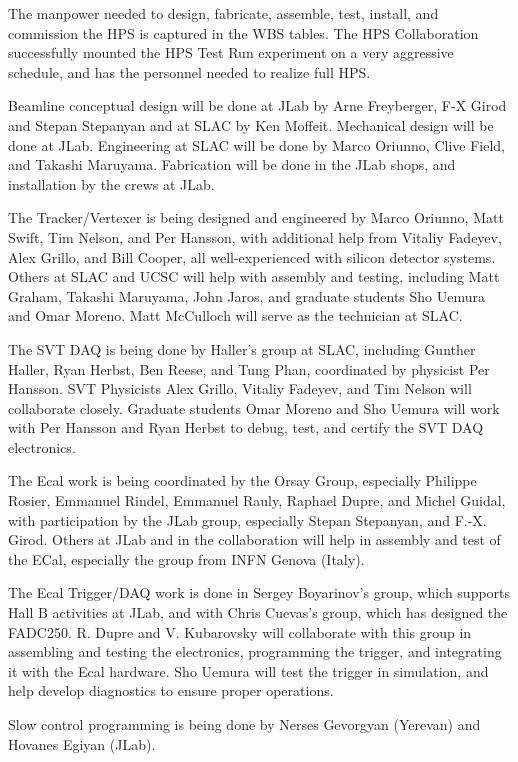 The manpower needed to design, fabricate, assemble, test, install, and commission the HPS is captured in the WBS tables. 
The HPS Collaboration successfully mounted the HPS Test Run experiment on a very aggressive schedule, and has the personnel needed to realize full HPS.

Beamline conceptual design will be done at JLab by Arne Freyberger, F-X Girod and Stepan Stepanyan and at SLAC by Ken Moffeit. 
Mechanical design will be done at JLab.
Engineering at SLAC will be done by Marco Oriunno, Clive Field, and Takashi Maruyama. Fabrication will be done in the 
JLab shops, and installation by the crews at JLab. 

The Tracker/Vertexer is being designed and engineered by Marco Oriunno, Matt Swift, Tim Nelson, and Per Hansson, with additional help 
from Vitaliy Fadeyev, Alex Grillo, and Bill Cooper, all well-experienced with silicon detector systems. Others at SLAC and UCSC will 
help with assembly and testing, including Matt Graham, Takashi Maruyama, John Jaros, and 
graduate students Sho Uemura and Omar Moreno. Matt McCulloch will serve as the technician at SLAC.

The SVT DAQ is being done by Haller's group at SLAC, including Gunther Haller, Ryan 
Herbst, Ben Reese, and Tung Phan, coordinated by physicist Per Hansson. SVT Physicists Alex Grillo, Vitaliy Fadeyev, and Tim Nelson will collaborate closely. 
Graduate students Omar Moreno and Sho Uemura will work with Per Hansson and Ryan Herbst to debug, test, and certify the SVT DAQ electronics.

The Ecal work is being coordinated by the Orsay Group, especially Philippe Rosier, Emmanuel Rindel, Emmanuel Rauly, Raphael Dupre, and Michel Guidal, 
with participation by the JLab group, especially Stepan Stepanyan, and F.-X. Girod.  Others at JLab and in the collaboration will help in 
assembly and test of the ECal, especially the group from INFN Genova (Italy).

The Ecal Trigger/DAQ work is done in Sergey Boyarinov's group, which supports Hall B activities at JLab, and with Chris Cuevas's group, which has designed the FADC250.
R. Dupre and  V. Kubarovsky will collaborate with this group in assembling and testing the electronics, programming the trigger, and integrating it with 
the Ecal hardware. Sho Uemura will test the trigger in simulation, and help develop diagnostics to ensure proper operations.

Slow control programming is being done by Nerses Gevorgyan (Yerevan) and Hovanes Egiyan (JLab).

